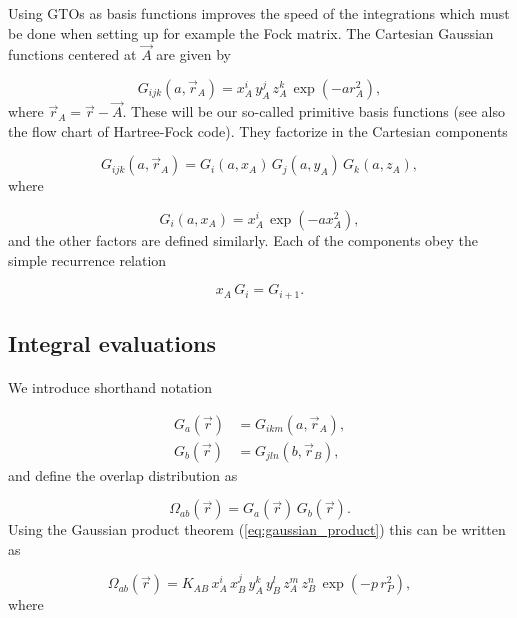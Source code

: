 \documentclass[%
twoside,                 %
final,                   %
10pt]{article}
\begin{document}
Using GTOs as basis functions improves the speed of the integrations which must be done when setting up 
for example the Fock matrix.
The Cartesian Gaussian functions centered at $\vec A$ are given by

\begin{equation}
 G_{ijk}(a, \vec r_A) = x^i_A\,y^j_A\,z^k_A\,\exp(-a r^2_A),
\end{equation}
where $\vec r_A = \vec r - \vec A$. These will be our so-called primitive basis functions (see also the flow chart of Hartree-Fock code). 
They factorize in the Cartesian components

\begin{equation}
 G_{ijk}(a, \vec r_A) = G_i(a, x_A)\,G_j(a, y_A)\,G_k(a, z_A),
\end{equation}
where

\begin{equation}
 G_i(a, x_A) = x^i_A\,\exp(-a x^2_A),
\end{equation}
and the other factors are defined similarly. Each of the components obey the simple recurrence relation

\begin{equation}
 x_A\,G_i = G_{i+1}.
\end{equation}



\subsection*{Integral evaluations}

\paragraph{}

We introduce  shorthand notation

\begin{align}
  G_a(\vec r) & = G_{ikm}(a, \vec r_A), \\
  G_b(\vec r) & = G_{jln}(b, \vec r_B),
\end{align}
and define the overlap distribution  as

\begin{equation}
 \Omega_{ab}(\vec r) = G_a(\vec r)\,G_b(\vec r).
\end{equation}
Using the Gaussian product theorem (\ref{eq:gaussian_product}) this can be written as

\begin{equation}
 \Omega_{ab}(\vec r) = K_{AB}\,x^i_A\,x^j_B\,y^k_A\,y^l_B\,z^m_A\,z^n_B\,\exp(-p\,r^2_P),
\end{equation}
where
\end{document}
